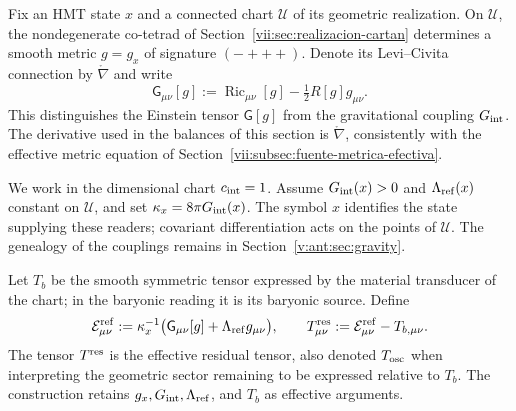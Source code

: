 Fix an HMT state \(x\) and a connected chart \(\mathcal U\) of its
geometric realization. On \(\mathcal U\), the nondegenerate co-tetrad
of Section~\ref{vii:sec:realizacion-cartan} determines a smooth metric
\(g=g_x\) of signature \((-+++)\). Denote its
Levi--Civita connection by \(\mathring\nabla\) and write
\[
 \mathsf G_{\mu\nu}[g]
 :=\operatorname{Ric}_{\mu\nu}[g]-\tfrac12R[g]g_{\mu\nu}.
\]
This distinguishes the Einstein tensor \(\mathsf G[g]\) from the gravitational
coupling \(G_{\rm int}\). The derivative used in the balances of
this section is \(\mathring\nabla\), consistently with the effective
metric equation of Section~\ref{vii:subsec:fuente-metrica-efectiva}.

We work in the dimensional chart \(c_{\rm int}=1\). Assume
\(G_{\rm int}(x)>0\) and \(\Lambda_{\rm ref}(x)\) constant on
\(\mathcal U\), and set \(\kappa_x=8\pi G_{\rm int}(x)\).
The symbol \(x\) identifies the state supplying these readers;
covariant differentiation acts on the points of \(\mathcal U\).
The genealogy of the couplings remains in
Section~\ref{v:ant:sec:gravity}.

Let \(T_b\) be the smooth symmetric tensor expressed by the material
transducer of the chart; in the baryonic reading it is its baryonic source. Define
\begin{equation}
 \mathcal E^{\rm ref}_{\mu\nu}
 :=\kappa_x^{-1}\bigl(\mathsf G_{\mu\nu}[g]
                            +\Lambda_{\rm ref}g_{\mu\nu}\bigr),
 \qquad
 T^{\rm res}_{\mu\nu}:=\mathcal E^{\rm ref}_{\mu\nu}-T_{b,\mu\nu}.
 \label{vii:eq:residual-definicion}
\end{equation}
The tensor \(T^{\rm res}\) is the effective residual tensor, also
denoted \(T_{\rm osc}\) when interpreting the geometric sector remaining
to be expressed relative to \(T_b\). The construction retains
\(g_x,G_{\rm int},\Lambda_{\rm ref}\), and \(T_b\) as effective arguments.

